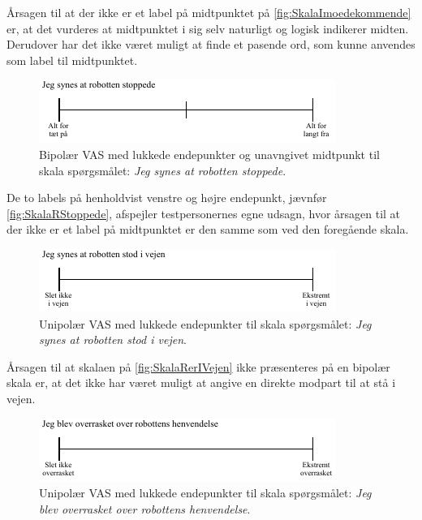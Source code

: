 Årsagen til at der ikke er et label på midtpunktet på \autoref{fig:SkalaImoedekommende} er, at det vurderes at midtpunktet i sig selv naturligt og logisk indikerer midten. Derudover har det ikke været muligt at finde et pasende ord, som kunne anvendes som label til midtpunktet.
\newpage  
%
\begin{figure}[H]
\centering
\includegraphics[width =\textwidth]{Figure/UdvalgteSkalaer/RStoppede} 
\caption{Bipolær VAS med lukkede endepunkter og unavngivet midtpunkt til skala spørgsmålet: \textit{Jeg synes at robotten stoppede}.}
\label{fig:SkalaRStoppede}
\end{figure}
\noindent
%
De to labels på henholdvist venstre og højre endepunkt, jævnfør \autoref{fig:SkalaRStoppede}, afspejler testpersonernes egne udsagn, hvor årsagen til at der ikke er et label på midtpunktet er den samme som ved den foregående skala. 
%
\begin{figure}[H]
\centering
\includegraphics[width =\textwidth]{Figure/UdvalgteSkalaer/RobottenErIVejen} 
\caption{Unipolær VAS med lukkede endepunkter til skala spørgsmålet: \textit{Jeg synes at robotten stod i vejen}.}
\label{fig:SkalaRerIVejen}
\end{figure}
\noindent
%
Årsagen til at skalaen på \autoref{fig:SkalaRerIVejen} ikke præsenteres på en bipolær skala er, at det ikke har været muligt at angive en direkte modpart til at stå i vejen. 
%
\begin{figure}[H]
\centering
\includegraphics[width =\textwidth]{Figure/UdvalgteSkalaer/OverrasketOverR} 
\caption{Unipolær VAS med lukkede endepunkter til skala spørgsmålet: \textit{Jeg blev overrasket over robottens henvendelse}.}
\label{fig:SkalaOverrasketOverR}
\end{figure}
